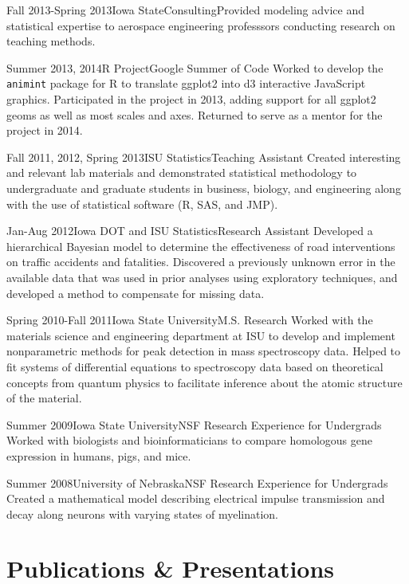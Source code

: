 \documentclass[10pt]{tccv}
\begin{document}
\begin{eventlist}
\item{Fall 2013-Spring 2013}{Iowa State}{Consulting}{Provided modeling advice and statistical expertise to aerospace engineering professsors conducting research on teaching methods.}


\item{Summer 2013, 2014}{R Project}{Google Summer of Code}{
Worked to develop the \texttt{animint} package for R to translate ggplot2 into d3 interactive JavaScript graphics. Participated in the project in 2013, adding support for all ggplot2 geoms as well as most scales and axes. Returned to serve as a mentor for the project in 2014. \cite{gprug2014}}

\item{Fall 2011, 2012, Spring 2013}{ISU Statistics}{Teaching Assistant}{
Created interesting and relevant lab materials and demonstrated statistical methodology to undergraduate and graduate students in business, biology, and engineering along with the use of statistical software (R, SAS, and JMP). }

\item{Jan-Aug 2012}{Iowa DOT and ISU Statistics}{Research Assistant}{
Developed a hierarchical Bayesian model to determine the effectiveness of road interventions on traffic accidents and fatalities. Discovered a previously unknown error in the available data that was used in prior analyses using exploratory techniques, and developed a method to compensate for missing data. }

\item{Spring 2010-Fall 2011}{Iowa State University}{M.S. Research}{
Worked with the materials science and engineering department at ISU to develop and implement nonparametric methods for peak detection in mass spectroscopy data. Helped to fit systems of differential equations to spectroscopy data based on theoretical concepts from quantum physics to facilitate inference about the atomic structure of the material. }

\item{Summer 2009}{Iowa State University}{NSF Research Experience for Undergrads}{
Worked with biologists and bioinformaticians to compare homologous gene expression in humans, pigs, and mice.\cite{towfic2010detection}}  

\item{Summer 2008}{University of Nebraska}{NSF Research Experience for Undergrads}{
Created a mathematical model describing electrical impulse transmission and decay along neurons with varying states of myelination.}
\end{eventlist}

\vspace{4.5in}
\section{Publications \& Presentations}


\nocite{*}
\end{document}
